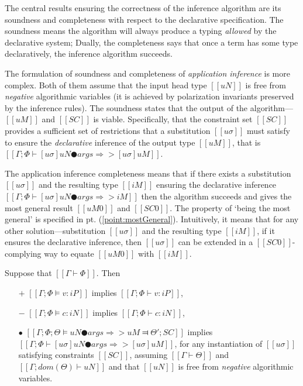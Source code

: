 The central results ensuring the correctness of the inference algorithm are its soundness and completeness with respect to the declarative specification.
The soundness means the algorithm will always
produce a typing \emph{allowed} by the declarative system;
Dually, the completeness says that once a term has some type declaratively, the inference algorithm succeeds. 

The formulation of soundness and completeness of \emph{application inference} is more complex.
Both of them assume that the input head type $[[uN]]$ is free from \emph{negative}
algorithmic variables (it is achieved by polarization invariants preserved by the inference rules).
The soundness states that the output of the algorithm---$[[uM]]$ and $[[SC]]$ is viable. 
Specifically, that the constraint set $[[SC]]$ provides a sufficient set of restrictions that 
a substitution $[[uσ]]$ must satisfy to ensure the \emph{declarative} inference of the output type $[[uM]]$, that is 
$[[ Γ ; Φ ⊢ [uσ]uN ● args ⇒> [uσ]uM ]]$.

The application inference completeness means that if 
there exists a substitution $[[uσ]]$ and the resulting type $[[iM]]$
ensuring the declarative inference $[[Γ; Φ ⊢ [uσ]uN ● args ⇒> iM]]$ then the algorithm succeeds
and gives the most general result $[[uM0]]$ and $[[SC0]]$.
The property of `being the most general' is specified in pt. (\ref{point:mostGeneral}).
Intuitively, it means that for any other solution---substitution $[[uσ]]$ and the resulting type $[[iM]]$,
if it ensures the declarative inference, then $[[uσ]]$ can be extended in a $[[SC0]]$-complying way to equate 
$[[uM0]]$ with $[[iM]]$.


\begin{theorem*}
    \label{thm:soundness-typing}
    Suppose that $[[Γ ⊢ Φ]]$. Then\footnotemark[1]
    \hfill
    \begin{itemize}
        \item [$+$] $[[Γ; Φ ⊨ v : iP]]$ implies $[[Γ; Φ ⊢ v : iP]]$,
        \item [$-$] $[[Γ; Φ ⊨ c : iN]]$ implies $[[Γ; Φ ⊢ c : iN]]$,
        \item [$\bullet$] $[[Γ; Φ; Θ ⊨ uN ● args ⇒> uM ⫤ Θ'; SC]]$ implies $[[ Γ ; Φ ⊢ [uσ]uN ● args ⇒> [uσ]uM ]]$, 
            for any instantiation of $[[uσ]]$ satisfying constraints $[[SC]]$,
            assuming $[[Γ ⊢ Θ]]$ and $[[Γ; dom(Θ) ⊢ uN]]$ and that $[[uN]]$ is free from 
            \emph{negative} algorithmic variables.
    \end{itemize}
\end{theorem*}

